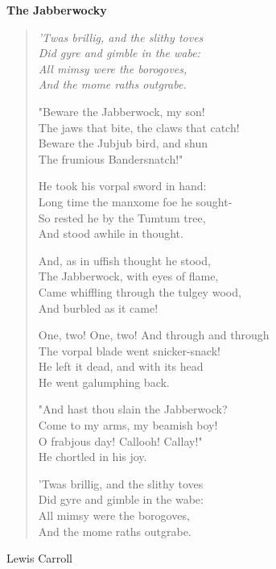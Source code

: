 \documentclass[12pt]{article}
\begin{document}
\begin{center}\Large\textbf{The Jabberwocky}\end{center}
\begin{verse}\itshape
'Twas brillig, and the slithy toves\\
Did gyre and gimble in the wabe:\\
All mimsy were the borogoves,\\
And the mome raths outgrabe.

"Beware the Jabberwock, my son!\\
The jaws that bite, the claws that catch!\\
Beware the Jubjub bird, and shun\\
The frumious Bandersnatch!"

He took his vorpal sword in hand:\\
Long time the manxome foe he sought-\\
So rested he by the Tumtum tree,\\
And stood awhile in thought.

And, as in uffish thought he stood,\\
The Jabberwock, with eyes of flame,\\
Came whiffling through the tulgey wood,\\
And burbled as it came!

One, two! One, two! And through and through\\
The vorpal blade went snicker-snack!\\
He left it dead, and with its head\\
He went galumphing back.

"And hast thou slain the Jabberwock?\\
Come to my arms, my beamish boy!\\
O frabjous day! Callooh! Callay!"\\
He chortled in his joy.

'Twas brillig, and the slithy toves\\
Did gyre and gimble in the wabe:\\
All mimsy were the borogoves,\\
And the mome raths outgrabe.
\end{verse}
\begin{flushright} Lewis Carroll\end{flushright}
\end{document}
